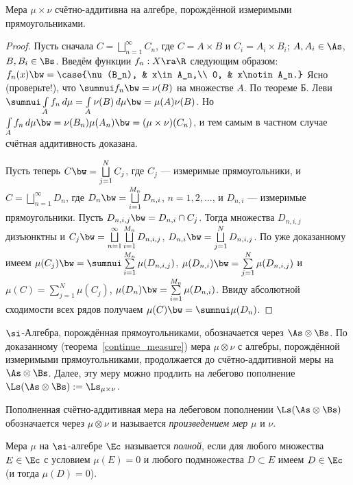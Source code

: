 \documentclass[10pt]{article}
\begin{document}
\begin{theorem}
Мера $\mu\times\nu$ счётно-аддитивна на алгебре, порождённой
измеримыми прямоугольниками.
\end{theorem}

\begin{proof}
Пусть сначала $C=\bigsqcup\limits_{n=1}^\infty C_n$, где $C=A\times
B$ и $C_i=A_i\times B_i$; $A,A_i\in\As$, $B,B_i\in\Bs$. Введём
функции $f_n: X\ra\R$ следующим образом: $f_n(x)\bw =\case{\nu(B_n),
& x\in A_n,\\ 0, & x\notin A_n.}$ Ясно (проверьте!), что $\sumnui
f_n\bw =\nu(B)$ на множестве $A$. По теореме Б. Леви
$\sumnui\int\limits_Af_n\,d\mu=\int\limits_A\nu(B)\,d\mu\bw
=\mu(A)\nu(B)$. Но $\int\limits_Af_n\,d\mu\bw =\nu(B_n)\mu(A_n)\bw
=(\mu\times\nu)(C_n)$, и тем самым в частном случае счётная
аддитивность доказана.

Пусть теперь $C\bw = \bigsqcup\limits_{j=1}^NC_j$, где $C_j$ ---
измеримые прямоугольники, и $C=\bigsqcup\limits_{n=1}^\infty D_n$,
где $D_n\bw =\bigsqcup\limits_{i=1}^{M_n}D_{n,i}$, $n=1,2,\ldots$, и
$D_{n,i}$ --- измеримые прямоугольники. Пусть $D_{n,i,j}\bw
=D_{n,i}\cap C_j$. Тогда множества $D_{n,i,j}$ дизъюнктны и $C_j\bw
=\bigsqcup\limits_{n=1}^\infty\bigsqcup\limits_{i=1}^{M_n}D_{n,i,j}$,
$D_{n,i}\bw =\bigsqcup\limits_{j=1}^N D_{n,i,j}$. По уже доказанному
имеем $\mu(C_j)\bw =\sumnui\sum\limits_{i=1}^{M_n}\mu(D_{n,i,j})$,
$\mu(D_{n,i})\bw =\sum\limits_{j=1}^N\mu(D_{n,i,j})$ и
$\mu(C)=\sum\limits_{j=1}^N\mu(C_j)$, $\mu(D_n)\bw
=\sum\limits_{i=1}^{M_n}\mu(D_{n,i})$. Ввиду абсолютной сходимости
всех рядов получаем $\mu(C)\bw =\sumnui\mu(D_n)$.
\end{proof}

$\si$-Алгебра, порождённая прямоугольниками, обозначается через
$\As\otimes\Bs$. По доказанному (теорема~\ref{continue_measure})
мера $\mu\otimes\nu$ с алгебры, порождённой измеримыми
прямоугольниками, продолжается до счётно-аддитивной меры на
$\As\otimes\Bs$. Далее, эту меру можно продлить на лебегово
пополнение $\Ls(\As\otimes\Bs):=\Ls_{\mu\times\nu}$.

Пополненная счётно-аддитивная мера на лебеговом пополнении
$\Ls(\As\otimes\Bs)$ обозначается через $\mu\otimes\nu$ и называется
\emph{произведением мер} $\mu$ и $\nu$.

\begin{df}
Мера $\mu$ на $\si$-алгебре $\Ec$ называется \emph{полной}, если для
любого множества $E\in\Ec$ с условием $\mu(E)=0$ и любого
подмножества $D\subset E$ имеем $D\in\Ec$ (и тогда $\mu(D)=0$).
\end{df}
\end{document}

